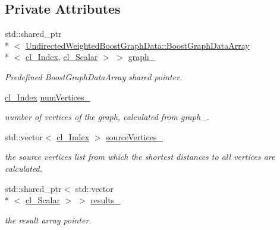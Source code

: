 \subsection*{Private Attributes}
\begin{DoxyCompactItemize}
\item 
std\+::shared\+\_\+ptr\\*
$<$ \hyperlink{struct_undirected_weighted_graph_1_1_graph_array}{Undirected\+Weighted\+BoostGraphData\+::\+BoostGraphData\+Array}\\*
$<$ \hyperlink{class_dijkstra_1_1_dijkstra_c_l_aab92585b062690f0835f154dc28f8c04}{cl\+\_\+\+Index}, \hyperlink{class_dijkstra_1_1_dijkstra_c_l_a5dc96724577a49ee14d4c2e1df3c0579}{cl\+\_\+\+Scalar} $>$ $>$ \hyperlink{class_dijkstra_1_1_dijkstra_c_l_a0b851e99d9aed1cc0671fc537efe3a20}{graph\+\_\+}
\begin{DoxyCompactList}\small\item\em Predefined BoostGraphData\+Array shared pointer. \end{DoxyCompactList}\item
\hyperlink{class_dijkstra_1_1_dijkstra_c_l_aab92585b062690f0835f154dc28f8c04}{cl\+\_\+\+Index} \hyperlink{class_dijkstra_1_1_dijkstra_c_l_a282256a0fd3793379edae35783130833}{num\+Vertices\+\_\+}
\begin{DoxyCompactList}\small\item\em number of vertices of the graph, calculated from graph\+\_\+. \end{DoxyCompactList}\item 
std\+::vector$<$ \hyperlink{class_dijkstra_1_1_dijkstra_c_l_aab92585b062690f0835f154dc28f8c04}{cl\+\_\+\+Index} $>$ \hyperlink{class_dijkstra_1_1_dijkstra_c_l_ae0327784ad33bc8cbd5c2c47e067d178}{source\+Vertices\+\_\+}
\begin{DoxyCompactList}\small\item\em the source vertices list from which the shortest distances to all vertices are calculated. \end{DoxyCompactList}\item 
std\+::shared\+\_\+ptr$<$ std\+::vector\\*
$<$ \hyperlink{class_dijkstra_1_1_dijkstra_c_l_a5dc96724577a49ee14d4c2e1df3c0579}{cl\+\_\+\+Scalar} $>$ $>$ \hyperlink{class_dijkstra_1_1_dijkstra_c_l_a51a092b08954b8a30b90514f86520b03}{results\+\_\+}
\begin{DoxyCompactList}\small\item\em the result array pointer. \end{DoxyCompactList}\item 

\end{DoxyCompactItemize}
